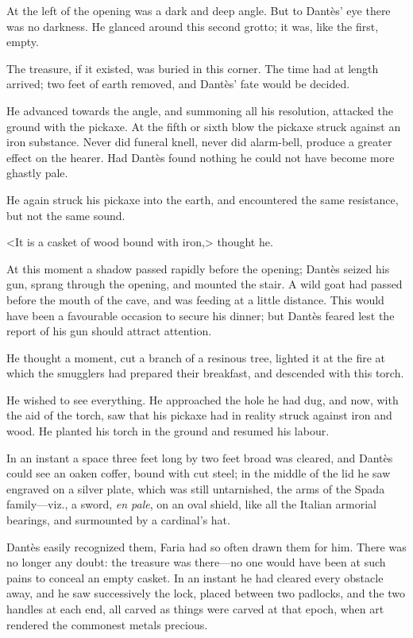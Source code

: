  At the left of the opening was a dark and deep angle. But to Dantès' eye there was no darkness. He glanced around this second grotto; it was, like the first, empty. 

 The treasure, if it existed, was buried in this corner. The time had at length arrived; two feet of earth removed, and Dantès' fate would be decided. 

 He advanced towards the angle, and summoning all his resolution, attacked the ground with the pickaxe. At the fifth or sixth blow the pickaxe struck against an iron substance. Never did funeral knell, never did alarm-bell, produce a greater effect on the hearer. Had Dantès found nothing he could not have become more ghastly pale. 

 He again struck his pickaxe into the earth, and encountered the same resistance, but not the same sound. 

 <It is a casket of wood bound with iron,> thought he. 

 At this moment a shadow passed rapidly before the opening; Dantès seized his gun, sprang through the opening, and mounted the stair. A wild goat had passed before the mouth of the cave, and was feeding at a little distance. This would have been a favourable occasion to secure his dinner; but Dantès feared lest the report of his gun should attract attention. 

 He thought a moment, cut a branch of a resinous tree, lighted it at the fire at which the smugglers had prepared their breakfast, and descended with this torch. 

 He wished to see everything. He approached the hole he had dug, and now, with the aid of the torch, saw that his pickaxe had in reality struck against iron and wood. He planted his torch in the ground and resumed his labour. 

 In an instant a space three feet long by two feet broad was cleared, and Dantès could see an oaken coffer, bound with cut steel; in the middle of the lid he saw engraved on a silver plate, which was still untarnished, the arms of the Spada family—viz., a sword, \textit{en pale}, on an oval shield, like all the Italian armorial bearings, and surmounted by a cardinal's hat. 

 Dantès easily recognized them, Faria had so often drawn them for him. There was no longer any doubt: the treasure was there—no one would have been at such pains to conceal an empty casket. In an instant he had cleared every obstacle away, and he saw successively the lock, placed between two padlocks, and the two handles at each end, all carved as things were carved at that epoch, when art rendered the commonest metals precious. 

